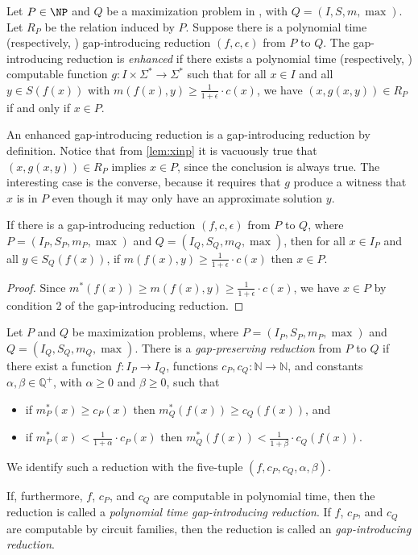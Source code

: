 \documentclass[]{article}
\begin{document}
\begin{definition}
  Let $P\in\NP$ and $Q$ be a maximization problem in \NPO, with $Q = (I, S, m, \max)$.
  Let $R_P$ be the \NP{} relation induced by $P$.
  Suppose there is a polynomial time (respectively, \NC) gap-introducing reduction $(f, c, \epsilon)$ from $P$ to $Q$.
  The gap-introducing reduction is \emph{enhanced} if there exists a polynomial time (respectively, \NC) computable function $g \colon I \times \Sigma^* \to \Sigma^*$ such that for all $x \in I$ and all $y \in S(f(x))$ with $m(f(x), y) \geq \frac{1}{1 + \epsilon} \cdot c(x)$, we have $\left(x, g(x, y)\right) \in R_P$ if and only if $x \in P$.
\end{definition}

An enhanced gap-introducing reduction is a gap-introducing reduction by definition.
Notice that from \autoref{lem:xinp} it is vacuously true that $\left(x, g(x, y)\right) \in R_P$ implies $x \in P$, since the conclusion is always true.
The interesting case is the converse, because it requires that $g$ produce a witness that $x$ is in $P$ even though it may only have an approximate solution $y$.

\begin{lemma}\label{lem:xinp}
  If there is a gap-introducing reduction $(f, c, \epsilon)$ from $P$ to $Q$, where $P = (I_P, S_P, m_P, \max)$ and $Q = (I_Q, S_Q, m_Q, \max)$, then for all $x \in I_P$ and all $y \in S_Q(f(x))$, if $m(f(x), y) \geq \frac{1}{1 + \epsilon} \cdot c(x)$ then $x \in P$.
\end{lemma}
\begin{proof}
  Since $m^*(f(x)) \geq m(f(x), y) \geq \frac{1}{1 + \epsilon} \cdot c(x)$, we have $x \in P$ by condition 2 of the gap-introducing reduction.
\end{proof}

\begin{definition}
  Let $P$ and $Q$ be maximization problems, where $P = (I_P, S_P, m_P, \max)$ and $Q = (I_Q, S_Q, m_Q, \max)$.
  There is a \emph{gap-preserving reduction} from $P$ to $Q$ if there exist a function $f \colon I_P \to I_Q$, functions $c_P, c_Q \colon \mathbb{N} \to \mathbb{N}$, and constants $\alpha, \beta \in \mathbb{Q}^+$, with $\alpha \geq 0$ and $\beta \geq 0$, such that
  \begin{itemize}
  \item if $m^*_P(x) \geq c_P(x)$ then $m^*_Q(f(x)) \geq c_Q(f(x))$, and
  \item if $m^*_P(x) < \frac{1}{1 + \alpha} \cdot c_P(x)$ then $m^*_Q(f(x)) < \frac{1}{1 + \beta} \cdot c_Q(f(x))$.
  \end{itemize}
  We identify such a reduction with the five-tuple $(f, c_P, c_Q, \alpha, \beta)$.

  If, furthermore, $f$, $c_P$, and $c_Q$ are computable in polynomial time, then the reduction is called a \emph{polynomial time gap-introducing reduction}.
  If $f$, $c_P$, and $c_Q$ are computable by \FNC{} circuit families, then the reduction is called an \emph{\NC{} gap-introducing reduction}.
\end{definition}
\end{document}
